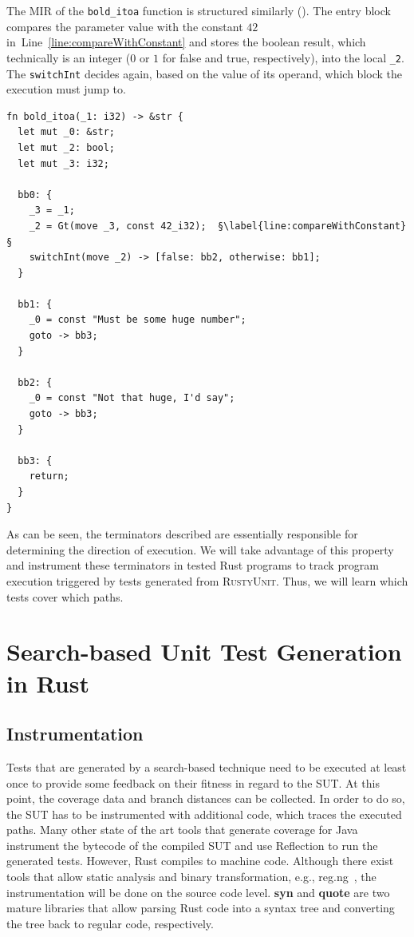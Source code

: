 \documentclass[paper=a4,%
  twoside,%
  BCOR4mm,%
  abstract=true,%
  toc=bibliography,%
  chapterprefix=true,%
  toc=bibliographynumbered,%
  open=right,%
  english,%
  pagesize=pdftex]{scrreprt}
\newcommand{\tech}{\textsc{RustyUnit}\xspace}
\newcommand{\mir}{\ac{MIR}\xspace}
\begin{document}
The \mir of the \texttt{bold\string_itoa} function is structured similarly (). The entry block compares the parameter value with the constant $42$ in~Line~\ref{line:compareWithConstant} and stores the boolean result, which technically is an integer ($0$ or $1$ for false and true, respectively), into the local \texttt{\string_2}. The \texttt{switchInt} decides again, based on the value of its operand, which block the execution must jump to.  

\begin{lstlisting}[style=boxed, escapechar=§, caption={\mir of the \texttt{bold\string_itoa} function}, label=lst:mir-lowered-second]
fn bold_itoa(_1: i32) -> &str {
  let mut _0: &str;                    
  let mut _2: bool;                    
  let mut _3: i32;                     

  bb0: {
    _3 = _1;                         
    _2 = Gt(move _3, const 42_i32);  §\label{line:compareWithConstant}§
    switchInt(move _2) -> [false: bb2, otherwise: bb1]; 
  }

  bb1: {
    _0 = const "Must be some huge number"; 
    goto -> bb3;
  }

  bb2: {
    _0 = const "Not that huge, I'd say";
    goto -> bb3;                     
  }

  bb3: {
    return;                          
  }
}
\end{lstlisting}

As can be seen, the terminators described are essentially responsible for determining the direction of execution. We will take advantage of this property and instrument these terminators in tested Rust programs to track program execution triggered by tests generated from \tech. Thus, we will learn which tests cover which paths.

\clearpage
\chapter{Search-based Unit Test Generation in Rust}
\label{chap:sbst-in-rust}

\section{Instrumentation}
Tests that are generated by a search-based technique need to be executed at least once to provide some feedback on their fitness in regard to the \ac{SUT}. At this point, the coverage data and branch distances can be collected. In order to do so, the \ac{SUT} has to be instrumented with additional code, which traces the executed paths. Many other state of the art tools that generate coverage for Java instrument the bytecode of the compiled \ac{SUT} and use Reflection to run the generated tests. However, Rust compiles to machine code. Although there exist tools that allow static analysis and binary transformation, e.g., reg.ng~\cite{DiFederico2018}, the instrumentation will be done on the source code level. \textbf{syn} and \textbf{quote} are two mature libraries that allow parsing Rust code into a syntax tree and converting the tree back to regular code, respectively.
\end{document}
